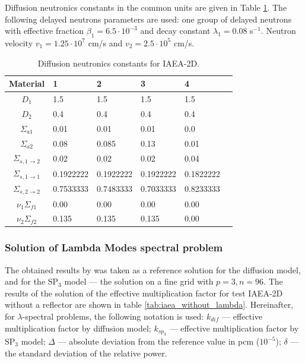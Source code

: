\documentclass[authoryear]{elsarticle}
\begin{document}
Diffusion neutronics constants in the common units are given in Table \ref{tab:iaea}.
The following delayed neutrons parameters are used: one group of delayed neutrons with effective fraction $\beta_1 = 6.5\cdot10^{-3}$ and decay constant $\lambda_1 = 0.08$ s$^{-1}$. 
Neutron velocity  $v_1 = 1.25 \cdot 10^7$ cm/s and $v_2 = 2.5 \cdot 10^5$ cm/s.

\begin{table}[h]
\caption{Diffusion neutronics constants for IAEA-2D.}
\label{tab:iaea}
\begin{center}
\begin{tabular}{c l l l l l}
\hline
Material & 1 & 2 & 3 & 4\\
\hline 
$D_1$ & 1.5 & 1.5 & 1.5 & 1.5\\
$D_2$ & 0.4 & 0.4 & 0.4 & 0.4\\
$\Sigma_{a1}$ & 0.01 & 0.01 & 0.01 & 0.0\\
$\Sigma_{a2}$ & 0.08 & 0.085 & 0.13 & 0.01\\
$\Sigma_{s,1\rightarrow2}$ & 0.02 & 0.02 & 0.02 & 0.04\\
$\Sigma_{s,1\rightarrow1}$ & 0.1922222 & 0.1922222 & 0.1922222 & 0.1822222\\
$\Sigma_{s,2\rightarrow2}$ & 0.7533333 & 0.7483333 & 0.7033333 & 0.8233333\\
$\nu_1\Sigma_{f1}$ & 0.00 & 0.00 & 0.00 & 0.00\\
$\nu_2\Sigma_{f2}$ & 0.135 & 0.135 & 0.135 & 0.00\\
\hline
\end{tabular}
\end{center}
\end{table}

\subsubsection{Solution of Lambda Modes spectral problem}
The obtained results by \citep{avvakumov2014} was taken as a reference solution for the diffusion model, and for the $\mathrm{SP_3}$ model --- the solution on a fine grid with $p = 3, n = 96$.
The results of the solution of the effective multiplication factor for test IAEA-2D without a reflector are shown in table \ref{tab:iaea_without_lambda}.
Hereinafter, for $\lambda$-spectral problems, the following notation is used: $k_{dif}$ --- effective multiplication factor by diffusion model; $k_{sp_3}$ --- effective multiplication factor by $\mathrm{SP_3}$ model; $\Delta$ --- absolute deviation from the reference value in pcm ($10^{-5}$); $\delta$ --- the standard deviation of the relative power. %
\end{document}
